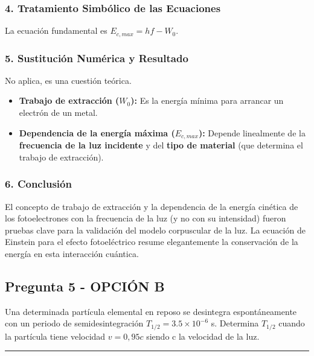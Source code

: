 \subsubsection*{4. Tratamiento Simbólico de las Ecuaciones}
La ecuación fundamental es $E_{c,max} = hf - W_0$.

\subsubsection*{5. Sustitución Numérica y Resultado}
No aplica, es una cuestión teórica.
\begin{cajaresultado}
\begin{itemize}
    \item \textbf{Trabajo de extracción ($W_0$):} Es la energía mínima para arrancar un electrón de un metal.
    \item \textbf{Dependencia de la energía máxima ($E_{c,max}$):} Depende linealmente de la \textbf{frecuencia de la luz incidente} y del \textbf{tipo de material} (que determina el trabajo de extracción).
\end{itemize}
\end{cajaresultado}

\subsubsection*{6. Conclusión}
\begin{cajaconclusion}
El concepto de trabajo de extracción y la dependencia de la energía cinética de los fotoelectrones con la frecuencia de la luz (y no con su intensidad) fueron pruebas clave para la validación del modelo corpuscular de la luz. La ecuación de Einstein para el efecto fotoeléctrico resume elegantemente la conservación de la energía en esta interacción cuántica.
\end{cajaconclusion}

\newpage

\subsection{Pregunta 5 - OPCIÓN B}
\label{subsec:5B_2006_sep}

\begin{cajaenunciado}
Una determinada partícula elemental en reposo se desintegra espontáneamente con un periodo de semidesintegración $T_{1/2}=3.5\times10^{-6}$ s. Determina $T_{1/2}$ cuando la partícula tiene velocidad $v=0,95c$ siendo c la velocidad de la luz. 
\end{cajaenunciado}
\hrule

